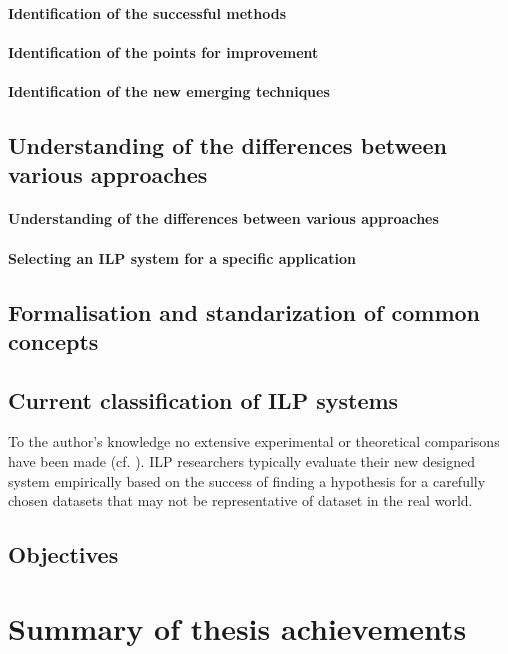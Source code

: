 \paragraph{Identification of the successful methods}
\paragraph{Identification of the points for improvement}
\paragraph{Identification of the new emerging techniques}

\subsection{Understanding of the differences between various approaches}
\paragraph{Understanding of the differences between various approaches}
\paragraph{Selecting an ILP system for a specific application}

\subsection{Formalisation and standarization of common concepts}

\subsection{Current classification of ILP systems}
To the author's knowledge no extensive experimental or theoretical comparisons have been made (cf. ). ILP researchers typically evaluate their new designed system empirically based on the success of finding a hypothesis for a carefully chosen datasets that may not be representative of dataset in the real world.

\subsection{Objectives}

\section{Summary of thesis achievements}

